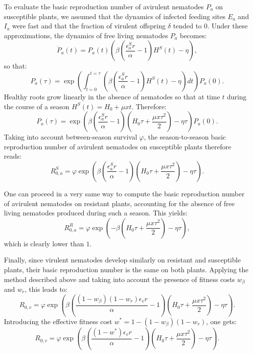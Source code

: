 To evaluate the basic reproduction number of avirulent nematodes $P_a$ on susceptible plants, we assumed that the dynamics of infected feeding sites $E_a$ and $I_a$ were fast and that the fraction of virulent  offspring $\delta$ tended to 0. Under these approximations, the dynamics of free living nematodes $P_a$ becomes:
\begin{equation*}
\dot{P}_a(t)=P_a(t) \left(  \beta\left( \frac{ \epsilon_a^S r}{\alpha}-1\right) H^S(t) - \eta \right),
\end{equation*}
so that:
\begin{equation*}
  P_a (\tau)= \exp\left(\int_{t=0}^{t=\tau} \left(\beta\left(\frac{ \epsilon_a^S r}{\alpha}-1\right) H^S(t)  - \eta\right) dt\right)P_a(0).
\end{equation*}
Healthy roots  grow linearly in the absence of nematodes so that at time $t$ during the course of a season $H^S(t) = H_0 + \mu x t$. Therefore:
\begin{equation*}
  P_a(\tau) = \exp\left(\beta\left( \frac{\epsilon_a^S r}{\alpha}-1\right) \left( H_0 \tau+\frac{\mu x \tau^2}{2}\right)-\eta \tau\right)P_a(0).
\end{equation*}
Taking into account between-season survival $\varphi$, the season-to-season basic reproduction number of avirulent nematodes on susceptible plants therefore reads:
\begin{equation*}
  R_{0,a}^S= \varphi \exp\left(\beta\left( \frac{\epsilon_a^S r}{\alpha}-1\right) \left( H_0 \tau+\frac{\mu x \tau^2}{2}\right)-\eta \tau\right).
\end{equation*}

One can proceed in a very same way to compute the basic reproduction number of avirulent nematodes on resistant plants, accounting for the absence of free living nematodes produced during such a season. This yields:
\begin{equation*}
  R_{0,a}^R= \varphi \exp\left(-\beta \left( H_0 \tau+\frac{\mu x \tau^2}{2}\right)-\eta \tau\right),
\end{equation*}
which is clearly lower than $1$.

Finally, since virulent nematodes develop similarly on resistant and susceptible plants, their basic reproduction number is the same on both plants. Applying the method described above and taking into account the presence of fitness costs $w_\beta$ and $w_r$, this leads to:
\begin{equation}
R_{0,v} = \varphi \exp\left(\beta\left( \frac{(1-w_\beta)(1-w_r)\epsilon_v r}{\alpha}-1\right) \left( H_0 \tau+\frac{\mu x \tau^2}{2}\right)-\eta \tau\right). \label{R0v}
 \end{equation}
Introducing the effective fitness cost $w^*=1-(1-w_\beta)(1-w_r)$, one gets:
\begin{equation*}
  R_{0,v} = \varphi \exp\left(\beta\left( \frac{(1-w^*)\epsilon_v r}{\alpha}-1\right) \left( H_0 \tau+\frac{\mu x \tau^2}{2}\right)-\eta \tau\right).
\end{equation*}


